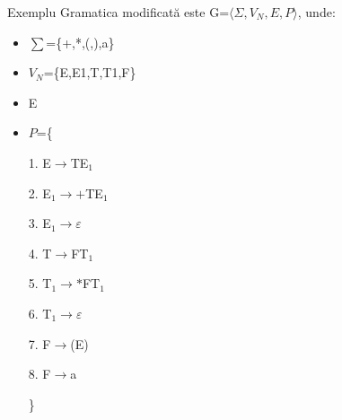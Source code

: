 \documentclass[pdf]{beamer}
\begin{document}
\begin{frame}{Exemplu}
Gramatica modificată este G=$\langle \Sigma, V_N, E, P \rangle$, unde:

\begin{itemize}
\item
$\sum$=\{+,*,(,),a\}
\item
$V_N$=\{E,E1,T,T1,F\}
\item
E
\item
$P$=\{

\hspace{1cm} 1. E$\rightarrow$TE$_1$

\hspace{1cm} 2. E$_1\rightarrow+$TE$_1$

\hspace{1cm} 3. E$_1\rightarrow \varepsilon$

\hspace{1cm} 4. T$\rightarrow$FT$_1$

\hspace{1cm} 5. T$_1\rightarrow *$FT$_1$

\hspace{1cm} 6. T$_1 \rightarrow \varepsilon$

\hspace{1cm} 7. F$ \rightarrow$(E)

\hspace{1cm} 8. F$ \rightarrow$a

\}
\end{itemize}

\end{frame}
\end{document}
